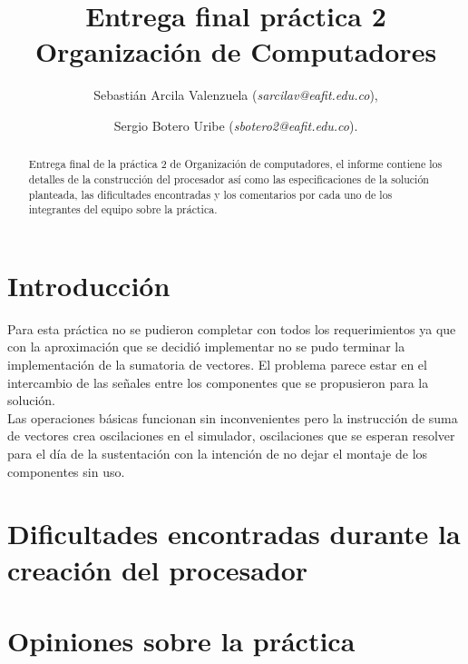 \documentclass[%
	final,
	notitlepage,
	narroweqnarray,
	inline,
	twoside,
	]{ieee}
\begin{document}
\title[Entrega final práctica 2]{%
       Entrega final práctica 2 \\  Organización de Computadores}

\author[]{Sebastián Arcila Valenzuela (\textit{sarcilav@eafit.edu.co}),
\and{} Sergio Botero Uribe (\textit{sbotero2@eafit.edu.co}).
}

\titletext{, \today}

\maketitle               

\begin{abstract} 
Entrega final de la práctica 2 de Organización de computadores, el informe contiene los detalles de la construcción del procesador
así como las especificaciones de la solución planteada, las dificultades encontradas y los comentarios por cada uno de los
integrantes del equipo sobre la práctica.
\end{abstract}
\section{Introducción}

Para esta práctica no se pudieron completar con todos los requerimientos ya que con la aproximación que se decidió implementar
no se pudo terminar la implementación de la sumatoria de vectores. El problema parece estar en el intercambio de las señales entre los
componentes que se propusieron para la solución.\\
Las operaciones básicas funcionan sin inconvenientes pero la instrucción de suma de vectores crea oscilaciones en el simulador,
oscilaciones que se esperan resolver para el día de la sustentación con la intención de no dejar el montaje de los componentes
sin uso.

	
	
\section{Dificultades encontradas durante la creación del procesador}
	
	 
\section{Opiniones sobre la práctica}
	
	


\end{document}
